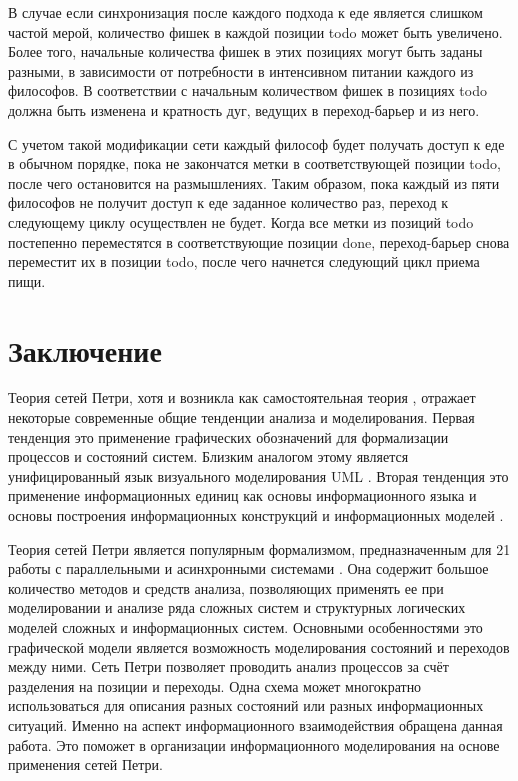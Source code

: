 В случае если синхронизация после каждого подхода к еде является слишком частой мерой, количество фишек в каждой позиции todo может быть увеличено. Более того, начальные количества фишек в этих позициях могут быть заданы разными, в зависимости от потребности в интенсивном питании каждого из философов. В соответствии с начальным количеством фишек в позициях todo должна быть изменена и кратность дуг, ведущих в переход-барьер и из него. 

С учетом такой модификации сети каждый философ будет получать доступ к еде в обычном порядке, пока не закончатся метки в соответствующей позиции todo, после чего остановится на размышлениях. Таким образом, пока каждый из пяти философов не получит доступ к еде заданное количество раз, переход к следующему циклу осуществлен не будет. Когда все метки из позиций todo постепенно переместятся в соответствующие позиции done, переход-барьер снова переместит их в позиции todo, после чего начнется следующий цикл приема пищи. 

\section*{Заключение}

Теория сетей Петри, хотя и возникла как самостоятельная теория \cite{Kotov}, отражает некоторые современные общие тенденции анализа и моделирования. Первая тенденция это применение графических обозначений для формализации процессов и состояний систем. Близким аналогом этому является унифицированный язык визуального моделирования UML \cite{Fowler}. Вторая тенденция это применение информационных единиц как основы информационного языка и основы построения информационных конструкций \cite{Tsvetkov5} и информационных моделей \cite{Breeden}. 

Теория сетей Петри является популярным формализмом, предназначенным для 21 работы с параллельными и асинхронными системами \cite{Leskin}. Она содержит большое количество методов и средств анализа, позволяющих применять ее при моделировании и анализе ряда сложных систем и структурных логических моделей \cite{Tsvetkov6} сложных и информационных систем. Основными особенностями это графической модели является возможность моделирования состояний и переходов между ними. Сеть Петри позволяет проводить анализ процессов за счёт разделения на позиции и переходы. Одна схема может многократно использоваться для описания разных состояний или разных информационных ситуаций. Именно на аспект информационного взаимодействия обращена данная работа. Это поможет в организации информационного моделирования на основе применения сетей Петри.


